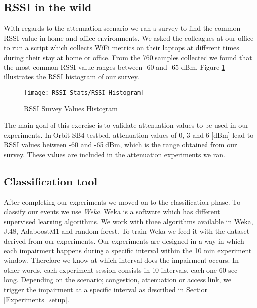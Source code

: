 \subsection{RSSI in the wild}\label{rsssi_in_the_wild}

With regards to the attenuation scenario we ran a survey to find the common RSSI value in home and office environments. We asked the colleagues at our office to run a script which collects WiFi metrics on their laptops at different times during their stay at home or office. From the 760 samples collected we found that the most common RSSI value ranges between -60 and -65 dBm. Figure \ref{fig:RSSI_Histogram} illustrates the RSSI histogram of our survey.

\begin{figure}[h]
	\centering
	\texttt{[image: RSSI\_Stats/RSSI\_Histogram]}
	\caption{RSSI Survey Values Histogram}
	\label{fig:RSSI_Histogram}
\end{figure}

The main goal of this exercise is to validate attenuation values to be used in our experiments. In Orbit SB4 testbed, attenuation values of 0, 3 and 6 [dBm] lead to RSSI values between -60 and -65 dBm, which is the range obtained from our survey. These values are included in the attenuation experiments we ran.

\subsection{Classification tool}

After completing our experiments we moved on to the classification phase. To classify our events we use \emph{Weka}. Weka is a software which has different supervised learning algorithms. We work with three algorithms available in Weka, J.48, AdaboostM1 and random forest. To train Weka we feed it with the dataset derived from our experiments. Our experiments are designed in a way in which each impairment happens during a specific interval within the 10 min experiment window. Therefore we know at which interval does the impairment occurs. In other words, each experiment session consists in 10 intervals, each one 60 sec long. Depending on the scenario; congestion, attenuation or access link, we trigger the impairment at a specific interval as described in Section \ref{Experiments_setup}.
\newpage




